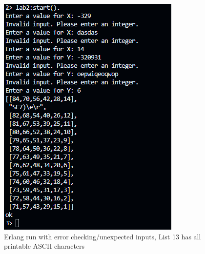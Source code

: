 \documentclass[letterpaper, 10pt]{article}
\begin{document}
\begin{figure}[htbp]
    \centering
    \includegraphics[width=\textwidth]{4.png}
    \caption{Erlang run with error checking/unexpected inputs, List 13 has all printable ASCII characters}
    \label{fig:4}
\end{figure}
\end{document}
